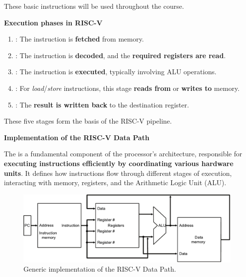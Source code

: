These basic instructions will be used throughout the course.

\highspace
\begin{flushleft}
    \textcolor{Green3}{ \textbf{Execution phases in RISC-V}}
\end{flushleft}
\begin{enumerate}
    \item {}: The instruction is \textbf{fetched} from memory.
    \item {}: The instruction is \textbf{decoded}, and the \textbf{required registers are read}.
    \item {}: The instruction is \textbf{executed}, typically involving ALU operations.
    \item {}: For \emph{load}/\emph{store} instructions, this stage \textbf{reads from} or \textbf{writes to} memory.
    \item {}: The \textbf{result is written back} to the destination register.
\end{enumerate}
These five stages form the basis of the RISC-V pipeline.

\newpage

\begin{flushleft}
    \textcolor{Green3}{ \textbf{Implementation of the RISC-V Data Path}}
\end{flushleft}
The  is a fundamental component of the processor's architecture, responsible for \textbf{executing instructions efficiently by coordinating various hardware units}. It defines how instructions flow through different stages of execution, interacting with memory, registers, and the Arithmetic Logic Unit (ALU).

\begin{figure}[!htp]
    \centering
    \includegraphics[width=\textwidth]{img/generic-risc-v-dp.pdf}
    \caption{Generic implementation of the RISC-V Data Path.}
\end{figure}


